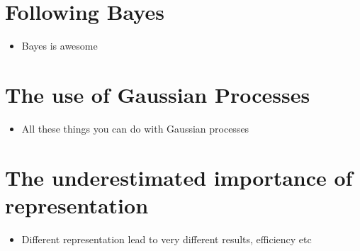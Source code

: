 
\ifpdf
    \graphicspath{{1_introduction/figures/PNG/}{1_introduction/figures/PDF/}{1_introduction/figures/}}
\else
    \graphicspath{{1_introduction/figures/EPS/}{1_introduction/figures/}}
\fi

\section{Following Bayes}

\begin{itemize}
\item Bayes is awesome
\end{itemize}

\section{The use of Gaussian Processes}

\begin{itemize}
\item All these things you can do with Gaussian processes
\end{itemize}

\section{The underestimated importance of representation}

\begin{itemize}
\item Different representation lead to very different results, efficiency etc
\end{itemize}


